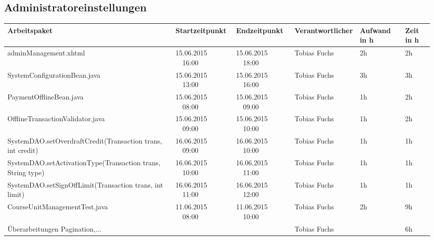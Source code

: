 \begin{landscape}
	\subsection{Administratoreinstellungen}
	\begin{tabular}{|p{10.3cm}|p{3.2cm}|p{3.2cm}|p{3.5cm}|p{1.7cm}|p{1.5cm}|}
		\hline  \textbf{Arbeitspaket} & \textbf{Startzeitpunkt} & \textbf{Endzeitpunkt} & \textbf{Verantwortlicher}  & \textbf{Aufwand in h} & \textbf{Zeit in h}\\
		\hline   adminManagement.xhtml                                 & 15.06.2015 \ \ 16:00       & 15.06.2015  \ \  18:00      & Tobias Fuchs &  2h   & 2h\\
		\hline   SystemConfigurationBean.java                          & 15.06.2015 \ \ 13:00       & 15.06.2015  \ \  16:00      & Tobias Fuchs &  3h   & 3h\\
		\hline   PaymentOfflineBean.java                               & 15.06.2015 \ \ 08:00       & 15.06.2015  \ \  09:00      & Tobias Fuchs &  1h   & 2h\\
		\hline   OfflineTransactionValidator.java                      & 15.06.2015 \ \ 09:00       & 15.06.2015  \ \  10:00      & Tobias Fuchs &  1h   & 2h\\
		\hline   SystemDAO.setOverdraftCredit(Transaction trans, int credit)  & 16.06.2015 \ \ 09:00       & 16.06.2015  \ \  10:00      & Tobias Fuchs &  1h   & 1h\\
		\hline   SystemDAO.setActivationType(Transaction trans, String type)  & 16.06.2015 \ \ 10:00       & 16.06.2015  \ \  11:00      & Tobias Fuchs &  1h   & 1h\\
		\hline   SystemDAO.setSignOffLimit(Transaction trans, int limit)      & 16.06.2015 \ \ 11:00       & 16.06.2015  \ \  12:00      & Tobias Fuchs &  1h   & 1h\\
		\hline   CourseUnitManagementTest.java                           & 11.06.2015 \ \ 08:00       & 11.06.2015  \ \  10:00       &  Tobias Fuchs &   2h     & 9h\\
		\hline   Überarbeitungen Pagination,...                     &      &                     &  Tobias Fuchs &    & 6h\\
		\hline 
	\end{tabular} \ \\
	\ \\
	

\end{landscape}
